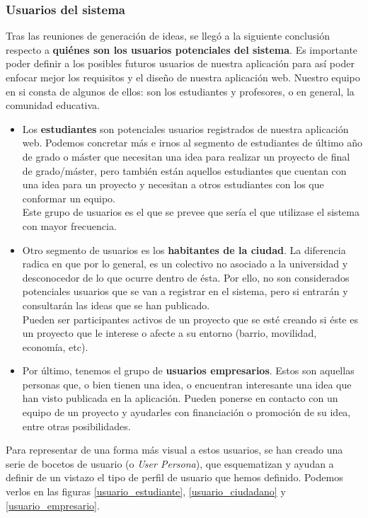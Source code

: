 \subsubsection{Usuarios del sistema}
Tras las reuniones de generación de ideas, se llegó a la siguiente conclusión respecto a \textbf{quiénes son los usuarios potenciales del sistema}. Es importante poder definir a los posibles futuros usuarios de nuestra aplicación para así poder enfocar mejor los requisitos y el diseño de nuestra aplicación web. Nuestro equipo en si consta de algunos de ellos: son los estudiantes y profesores, o en general, la comunidad educativa.

\begin{itemize}
    \item Los \textbf{estudiantes} son potenciales usuarios registrados de nuestra aplicación web. Podemos concretar más e irnos al segmento de estudiantes de último año de grado o máster que necesitan una idea para realizar un proyecto de final de grado/máster, pero también están aquellos estudiantes que cuentan con una idea para un proyecto y necesitan a otros estudiantes con los que conformar un equipo.\\
    Este grupo de usuarios es el que se prevee que sería el que utilizase el sistema con mayor frecuencia.
    \item Otro segmento de usuarios es los \textbf{habitantes de la ciudad}. La diferencia radica en que por lo general, es un colectivo no asociado a la universidad y desconocedor de lo que ocurre dentro de ésta. Por ello, no son considerados potenciales usuarios que se van a registrar en el sistema, pero si entrarán y consultarán las ideas que se han publicado.\\
    Pueden ser participantes activos de un proyecto que se esté creando si éste es un proyecto que le interese o afecte a su entorno (barrio, movilidad, economía, etc).
    \item Por último, tenemos el grupo de \textbf{usuarios empresarios}. Estos son aquellas personas que, o bien tienen una idea, o encuentran interesante una idea que han visto publicada en la aplicación. Pueden ponerse en contacto con un equipo de un proyecto y ayudarles con financiación o promoción de su idea, entre otras posibilidades.
\end{itemize}

Para representar de una forma más visual a estos usuarios, se han creado una serie de bocetos de usuario (o \textit{User Persona}), que esquematizan y ayudan a definir de un vistazo el tipo de perfil de usuario que hemos definido. Podemos verlos en las figuras \ref{usuario_estudiante}, \ref{usuario_ciudadano} y \ref{usuario_empresario}.\\

